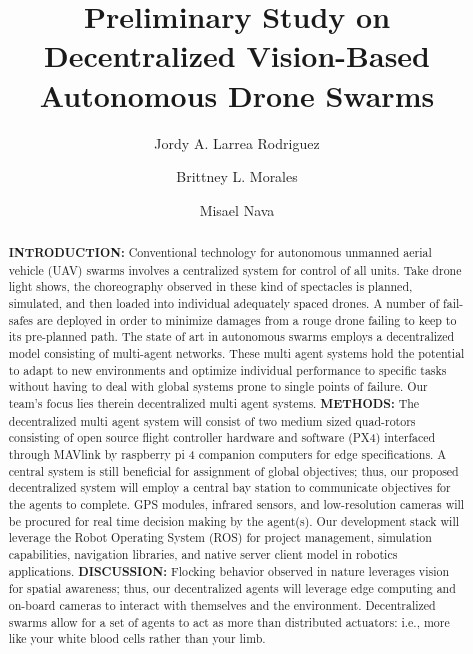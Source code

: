 \documentclass[%
 aip,
cp,  %
 amsmath,amssymb,%
 reprint,%
]{revtex4-2}
\begin{document}
\title{Preliminary Study on Decentralized Vision-Based Autonomous Drone Swarms}%

\author{Jordy A. Larrea Rodriguez} %

\author{Brittney L. Morales}%

\author{Misael Nava}

\begin{abstract}

\textbf{INTRODUCTION: } Conventional technology for autonomous unmanned aerial vehicle (UAV) swarms involves a centralized system for control of all units. Take drone light shows, the choreography observed in these kind of spectacles is planned, simulated, and then loaded into individual adequately spaced drones. A number of fail-safes are deployed in order to minimize damages from a rouge drone failing to keep to its pre-planned path. The state of art in autonomous swarms employs a decentralized model consisting of multi-agent networks. These multi agent systems hold the potential to adapt to new environments and optimize individual performance to specific tasks without having to deal with global systems prone to single points of failure. Our team's focus lies therein decentralized multi agent systems.    
\newline\textbf{METHODS: } The decentralized multi agent system will consist of two medium sized quad-rotors consisting of open source flight controller hardware and software (PX4) interfaced through MAVlink by raspberry pi 4 companion computers for edge specifications. A central system is still beneficial for assignment of global objectives; thus, our proposed decentralized system will employ a central bay station to communicate objectives for the agents to complete. GPS modules, infrared sensors, and low-resolution cameras will be procured for real time decision making by the agent(s). Our development stack will leverage the Robot Operating System (ROS) for project management, simulation capabilities, navigation libraries, and native server client model in robotics applications.  
\newline\textbf{DISCUSSION: } Flocking behavior observed in nature leverages vision for spatial awareness; thus, our decentralized agents will leverage edge computing and on-board cameras to interact with themselves and the environment. Decentralized swarms allow for a set of agents to act as more than distributed actuators: i.e., more like your white blood cells rather than your limb. 

\end{abstract}
\end{document}
